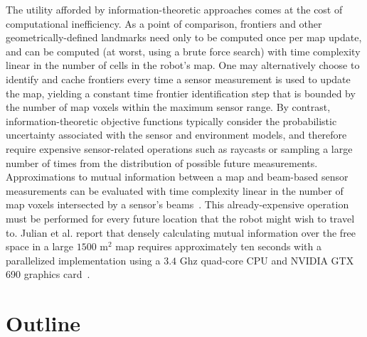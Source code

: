 The utility afforded by information-theoretic approaches comes at the cost of
computational inefficiency.
As a point of comparison, frontiers and other geometrically-defined landmarks
need only to be computed once per map update, and can be computed (at worst, using a brute force search)
with time complexity linear in the number of cells in the robot's map.
One may alternatively choose to identify and cache frontiers every time a sensor
measurement is used to update the map, yielding a constant time frontier
identification step that is bounded by the number of map voxels within the maximum sensor range.
By contrast, information-theoretic objective functions typically consider the probabilistic
uncertainty associated with the sensor and environment models, and therefore
require expensive sensor-related operations such as raycasts or sampling a large
number of times from the distribution of possible future measurements.
Approximations to mutual information between a map and beam-based sensor
measurements can be evaluated with time complexity linear in the number of map
voxels intersected by a sensor's
beams~\cite{julian2013mutualthesis,charrow2015icra,nelson2015iros}. This
already-expensive operation must be performed for every future location that the
robot might wish to travel to. Julian et al. report that densely calculating
mutual information over the free space in a large $1500$ m$^{2}$ map requires
approximately ten seconds with a parallelized implementation using a $3.4$ Ghz
quad-core CPU and NVIDIA GTX 690 graphics card~\cite{julian2013mutual}.

\section{Outline}




